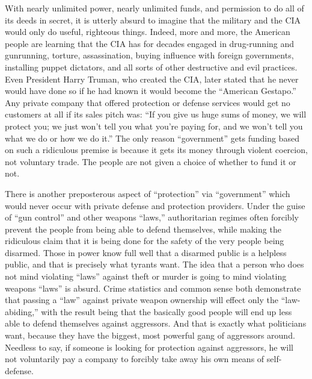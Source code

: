 \documentclass{book}
\begin{document}
With nearly unlimited power, nearly unlimited funds, and permission to do all of its deeds in secret, it is utterly absurd to imagine that the military and the CIA would only do useful, righteous things. Indeed, more and more, the American people are learning that the CIA has for decades engaged in drug-running and gunrunning, torture, assassination, buying influence with foreign governments, installing puppet dictators, and all sorts of other destructive and evil practices. Even President Harry Truman, who created the CIA, later stated that he never would have done so if he had known it would become the \enquote{American Gestapo.} Any private company that offered protection or defense services would get no customers at all if its sales pitch was: \enquote{If you give us huge sums of money, we will protect you; we just won't tell you what you're paying for, and we won't tell you what we do or how we do it.} The only reason \enquote{government} gets funding based on such a ridiculous premise is because it gets its money through violent coercion, not voluntary trade. The people are not given a choice of whether to fund it or not.

There is another preposterous aspect of \enquote{protection} via \enquote{government} which would never occur with private defense and protection providers. Under the guise of \enquote{gun control} and other weapons \enquote{laws,} authoritarian regimes often forcibly prevent the people from being able to defend themselves, while making the ridiculous claim that it is being done for the safety of the very people being disarmed. Those in power know full well that a disarmed public is a helpless public, and that is precisely what tyrants want. The idea that a person who does not mind violating \enquote{laws} against theft or murder is going to mind violating weapons \enquote{laws} is absurd. Crime statistics and common sense both demonstrate that passing a \enquote{law} against private weapon ownership will effect only the \enquote{law-abiding,} with the result being that the basically good people will end up less able to defend themselves against aggressors. And that is exactly what politicians want, because they have the biggest, most powerful gang of aggressors around. Needless to say, if someone is looking for protection against aggressors, he will not voluntarily pay a company to forcibly take away his own means of self-defense.
\end{document}
